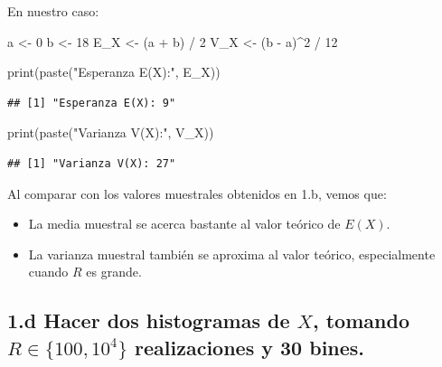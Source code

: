 \documentclass[
]{article}
\newenvironment{Shaded}{}{}
\newcommand{\DecValTok}[1]{\textcolor[rgb]{0.25,0.63,0.44}{#1}}
\newcommand{\FunctionTok}[1]{\textcolor[rgb]{0.02,0.16,0.49}{#1}}
\newcommand{\NormalTok}[1]{#1}
\newcommand{\OtherTok}[1]{\textcolor[rgb]{0.00,0.44,0.13}{#1}}
\newcommand{\SpecialCharTok}[1]{\textcolor[rgb]{0.25,0.44,0.63}{#1}}
\newcommand{\StringTok}[1]{\textcolor[rgb]{0.25,0.44,0.63}{#1}}
\providecommand{\tightlist}{%
  \setlength{\itemsep}{0pt}\setlength{\parskip}{0pt}}
\begin{document}
En nuestro caso:

\begin{Shaded}
\begin{Highlighting}[]
\NormalTok{a }\OtherTok{\textless{}{-}} \DecValTok{0}
\NormalTok{b }\OtherTok{\textless{}{-}} \DecValTok{18}
\NormalTok{E\_X }\OtherTok{\textless{}{-}}\NormalTok{ (a }\SpecialCharTok{+}\NormalTok{ b) }\SpecialCharTok{/} \DecValTok{2}
\NormalTok{V\_X }\OtherTok{\textless{}{-}}\NormalTok{ (b }\SpecialCharTok{{-}}\NormalTok{ a)}\SpecialCharTok{\^{}}\DecValTok{2} \SpecialCharTok{/} \DecValTok{12}

\FunctionTok{print}\NormalTok{(}\FunctionTok{paste}\NormalTok{(}\StringTok{"Esperanza E(X):"}\NormalTok{, E\_X))}
\end{Highlighting}
\end{Shaded}

\begin{verbatim}
## [1] "Esperanza E(X): 9"
\end{verbatim}

\begin{Shaded}
\begin{Highlighting}[]
\FunctionTok{print}\NormalTok{(}\FunctionTok{paste}\NormalTok{(}\StringTok{"Varianza V(X):"}\NormalTok{, V\_X))}
\end{Highlighting}
\end{Shaded}

\begin{verbatim}
## [1] "Varianza V(X): 27"
\end{verbatim}

Al comparar con los valores muestrales obtenidos en 1.b, vemos que:

\begin{itemize}
\tightlist
\item
  La media muestral se acerca bastante al valor teórico de \(E(X)\).
\item
  La varianza muestral también se aproxima al valor teórico,
  especialmente cuando \(R\) es grande.
\end{itemize}

\subsection{\texorpdfstring{1.d Hacer dos histogramas de \(X\), tomando
\(R \in \{100, 10^4\}\) realizaciones y 30
bines.}{1.d Hacer dos histogramas de X, tomando R \textbackslash in \textbackslash\{100, 10\^{}4\textbackslash\} realizaciones y 30 bines.}}\label{d-hacer-dos-histogramas-de-x-tomando-r-in-100-104-realizaciones-y-30-bines.}
\end{document}
